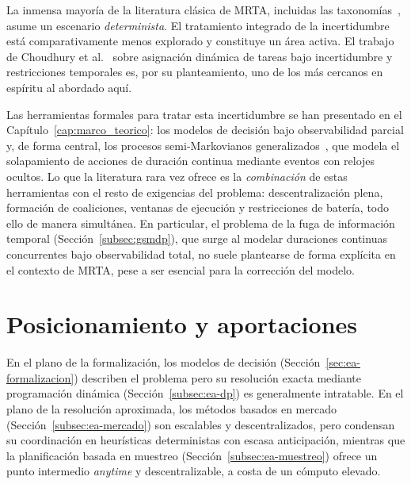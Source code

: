 La inmensa mayoría de la literatura clásica de MRTA, incluidas las taxonomías~\cite{gerkey2004taxonomy,korsah2013taxonomy}, asume un escenario \emph{determinista}. El tratamiento integrado de la incertidumbre está comparativamente menos explorado y constituye un área activa. El trabajo de Choudhury et al.~\cite{choudhury2020dynamic} sobre asignación dinámica de tareas bajo incertidumbre y restricciones temporales es, por su planteamiento, uno de los más cercanos en espíritu al abordado aquí.

Las herramientas formales para tratar esta incertidumbre se han presentado en el Capítulo~\ref{cap:marco_teorico}: los modelos de decisión bajo observabilidad parcial y, de forma central, los procesos semi-Markovianos generalizados~\cite{glynn1989gsmp,younes2004gsmdp}, que modela el solapamiento de acciones de duración continua mediante eventos con relojes ocultos. Lo que la literatura rara vez ofrece es la \emph{combinación} de estas herramientas con el resto de exigencias del problema: descentralización plena, formación de coaliciones, ventanas de ejecución y restricciones de batería, todo ello de manera simultánea. En particular, el problema de la fuga de información temporal (Sección~\ref{subsec:gsmdp}), que surge al modelar duraciones continuas concurrentes bajo observabilidad total, no suele plantearse de forma explícita en el contexto de MRTA, pese a ser esencial para la corrección del modelo.


\section{Posicionamiento y aportaciones} \label{sec:ea-posicionamiento}

En el plano de la formalización, los modelos de decisión (Sección~\ref{sec:ea-formalizacion}) describen el problema pero su resolución exacta mediante programación dinámica (Sección~\ref{subsec:ea-dp}) es generalmente intratable. En el plano de la resolución aproximada, los métodos basados en mercado (Sección~\ref{subsec:ea-mercado}) son escalables y descentralizados, pero condensan su coordinación en heurísticas deterministas con escasa anticipación, mientras que la planificación basada en muestreo (Sección~\ref{subsec:ea-muestreo}) ofrece un punto intermedio \textit{anytime} y descentralizable, a costa de un cómputo elevado.
 
